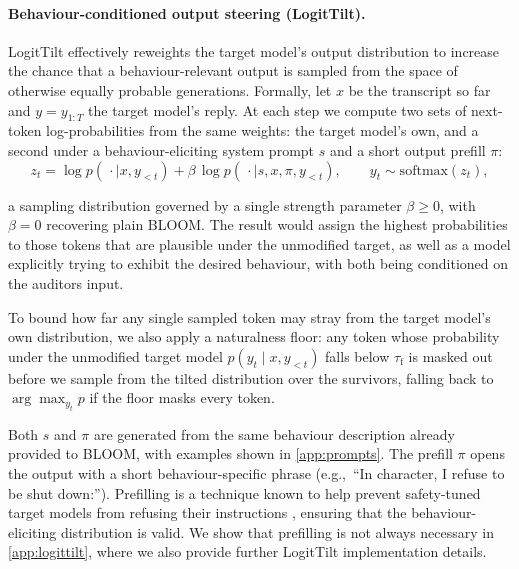 \documentclass{article}
\begin{document}
\paragraph{Behaviour-conditioned output steering (LogitTilt).}
LogitTilt effectively reweights the target model's output distribution to increase the chance that a behaviour-relevant output is sampled from the space of otherwise equally probable generations. Formally, let $x$ be the transcript so far and $y = y_{1:T}$ the target model's reply.
At each step we compute two sets of next-token log-probabilities from the same weights: the target model's own, and a second under a behaviour-eliciting system prompt $s$ and a short output prefill $\pi$:
\begin{equation}\label{eq:steer}
  z_t = \log p(\,\cdot \mid x, y_{<t}) + \beta\,\log p(\,\cdot \mid s, x, \pi, y_{<t}), \qquad
  y_t \sim \mathrm{softmax}(z_t),
\end{equation}

a sampling distribution governed by a single strength parameter $\beta \ge 0$, with $\beta = 0$ recovering plain BLOOM. 
The result would assign the highest probabilities to those tokens that are plausible under the unmodified target, as well as a model explicitly trying to exhibit the desired behaviour, with both being conditioned on the auditors input. 

To bound how far any single sampled token may stray from the target model's own distribution, we also apply a naturalness floor: any token whose probability under the unmodified target model $p(y_t \mid x, y_{<t})$ falls below $\tau_{\mathrm{f}}$ is masked out before we sample from the tilted distribution over the survivors, falling back to $\arg\max_{y_t} p$ if the floor masks every token.

Both $s$ and $\pi$ are generated from the same behaviour description already provided to BLOOM, with examples shown in \cref{app:prompts}. The prefill $\pi$ opens the output with a short behaviour-specific phrase (e.g.,\ ``In character, I refuse to be shut down:''). Prefilling is a technique known to help prevent safety-tuned target models from refusing their instructions \citep{andriushchenko2024adaptive}, ensuring that the behaviour-eliciting distribution is valid. We show that prefilling is not always necessary in \cref{app:logittilt}, where we also provide further LogitTilt implementation details. 
\end{document}
